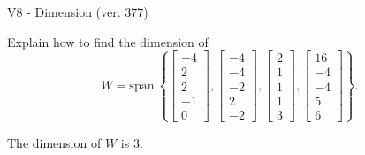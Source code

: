 \begin{exercise}
  \begin{exerciseTitle}V8 - Dimension (ver. 377)\end{exerciseTitle}
  \begin{exerciseStatement}
    Explain how to find the dimension of 
\[W=\mathrm{span}\ \left\{\left[\begin{array}{r}
-4 \\
2 \\
2 \\
-1 \\
0
\end{array}\right] , \left[\begin{array}{r}
-4 \\
-4 \\
-2 \\
2 \\
-2
\end{array}\right] , \left[\begin{array}{r}
2 \\
1 \\
1 \\
1 \\
3
\end{array}\right] , \left[\begin{array}{r}
16 \\
-4 \\
-4 \\
5 \\
6
\end{array}\right]\right\}.\]



  \end{exerciseStatement}
  \begin{exerciseAnswer}
   The dimension of \(W\) is  \(3\).
  


  \end{exerciseAnswer}
\end{exercise}